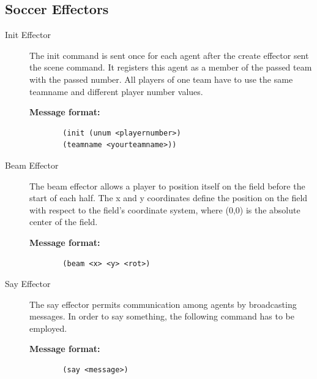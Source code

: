 \subsection{Soccer Effectors}
\begin{description}
  \item [Init Effector]
  The init command is sent once for each agent after the create effector sent the scene command. It registers this agent as a member of the passed team with the passed number. All players of one team have to use the same teamname and different player number values.
  \begin{description}
  \item[{\bf Message format:}]
  \begin{verbatim}
  (init (unum <playernumber>)
  (teamname <yourteamname>))
  \end{verbatim}
  \end{description}



  \item [Beam Effector]
  The beam effector allows a player to position itself on the field before the start of each half. The x and y coordinates define the position on the field with respect to the field's coordinate system, where (0,0) is the absolute center of the field.
  \begin{description}
  \item[{\bf Message format:}]
  \begin{verbatim}
  (beam <x> <y> <rot>)
  \end{verbatim}
  \end{description}



  \item [Say Effector]
  The say effector permits communication among agents by broadcasting messages. In order to say something, the following command has to be employed.
  \begin{description}
  \item[{\bf Message format:}]
  \begin{verbatim}
  (say <message>)
  \end{verbatim}
  \end{description}

\end{description}
